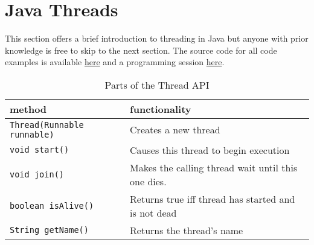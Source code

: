 \graphicspath{{./lab02/Images/}}


\maketocpage

\section{Java Threads}
This section offers a brief introduction to threading in Java but anyone with prior knowledge is free to skip to the next section. The source code for all code examples is available \href{https://github.com/JonSteinn/AndroidDevelopment/tree/master/examples/lab2/javathreads}{here} and a programming session \href{TODO}{here}.

\begin{table}[H]
\center
\begin{tabular}{l|l}
method & functionality \\
\hline
\texttt{Thread(Runnable runnable)} & Creates a new thread \\
\texttt{void start()} & Causes this thread to begin execution \\
\texttt{void join()} & Makes the calling thread wait until this one dies. \\
\texttt{boolean isAlive()} & Returns true iff thread has started and is not dead \\
\texttt{String getName()} & Returns the thread's name
\end{tabular}
\caption{Parts of the Thread API}
\label{table:tapi}
\end{table}

